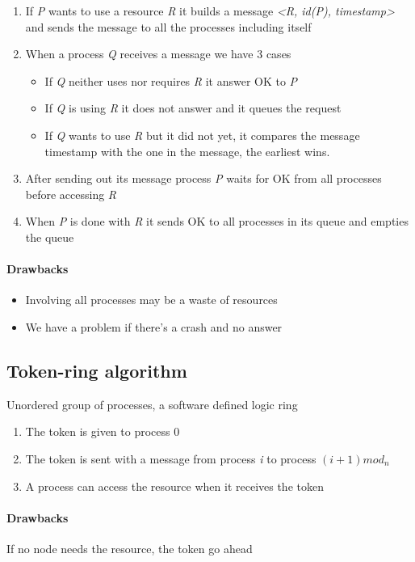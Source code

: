 \begin{enumerate}
    \item If \textit{P} wants to use a resource \textit{R} it builds a message \textit{<R, id(P), timestamp>} and sends the message to all the processes including itself
    \item When a process \textit{Q} receives a message we have 3 cases
    \begin{itemize}
        \item If \textit{Q} neither uses nor requires \textit{R} it answer OK to \textit{P}
        \item If \textit{Q} is using \textit{R} it does not answer and it queues the request
        \item If \textit{Q} wants to use \textit{R} but it did not yet, it compares the message timestamp with the one in the message, the earliest wins.
    \end{itemize}
    \item After sending out its message process \textit{P} waits for OK from all processes before accessing \textit{R}
    \item When \textit{P} is done with \textit{R} it sends OK to all processes in its queue and empties the queue
\end{enumerate}

\paragraph{Drawbacks}
\begin{itemize}
    \item Involving all processes may be a waste of resources
    \item We have a problem if there’s a crash and no answer
\end{itemize}

\subsection{Token-ring algorithm}
Unordered group of processes, a software defined logic ring
\begin{enumerate}
    \item The token is given to process $0$
    \item The token is sent with a message from process \textit{i} to process $(i+1)mod_n$
    \item A process can access the resource when it receives the token
\end{enumerate}

\paragraph{Drawbacks}
If no node needs the resource, the token go ahead

\newpage
